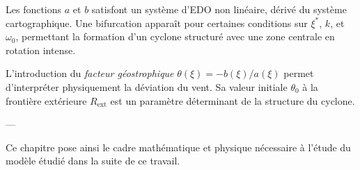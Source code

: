 Les fonctions \( a \) et \( b \) satisfont un système d’EDO non linéaire, dérivé du système cartographique. Une bifurcation apparaît pour certaines conditions sur \( \xi^* \), \( k \), et \( \omega_0 \), permettant la formation d’un cyclone structuré avec une zone centrale en rotation intense.

L’introduction du \textit{facteur géostrophique} \( \theta(\xi) = -b(\xi)/a(\xi) \) permet d’interpréter physiquement la déviation du vent. Sa valeur initiale \( \theta_0 \) à la frontière extérieure \( R_{\text{ext}} \) est un paramètre déterminant de la structure du cyclone.

---

Ce chapitre pose ainsi le cadre mathématique et physique nécessaire à l’étude du modèle étudié dans la suite de ce travail.
